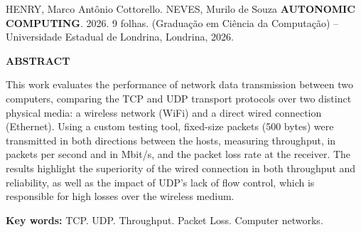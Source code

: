 \noindent HENRY, Marco Antônio Cottorello. NEVES, Murilo de Souza
\textbf{AUTONOMIC COMPUTING}. 2026. 9 folhas. 
(Graduação em Ciência da Computação) -- Universidade
Estadual de Londrina, Londrina, 2026.

\vspace{2\baselineskip}
\begin{center}
  \textbf{ABSTRACT}
\end{center}

\vspace{\baselineskip}

\noindent This work evaluates the performance of network data transmission between two computers, comparing the TCP and UDP transport protocols over two distinct
physical media: a wireless network (WiFi) and a direct wired connection
(Ethernet). Using a custom testing tool, fixed-size packets (500 bytes) were
transmitted in both directions between the hosts, measuring throughput, in
packets per second and in Mbit/s, and the packet loss rate at the receiver.
The results highlight the superiority of the wired connection in both
throughput and reliability, as well as the impact of UDP's lack of flow
control, which is responsible for high losses over the wireless medium.

\vfill

\noindent\textbf{Key words:} TCP. UDP. Throughput. Packet Loss. Computer networks.
